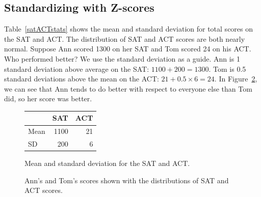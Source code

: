 \subsection{Standardizing with Z-scores}

\noindent%

\newcommand{\satmean}{1100}
\newcommand{\satsd}{200}
\newcommand{\actmean}{21}
\newcommand{\actsd}{6}
\newcommand{\annsatscore}{1300}
\newcommand{\annsatzscore}{1}
\newcommand{\tomsatscore}{24}
\newcommand{\tomsatzscore}{0.5}

\begin{examplewrap}
\begin{nexample}{Table~\vref{satACTstats} shows the mean
    and standard deviation for total scores on the SAT and ACT.
    The distribution of SAT and ACT scores are both nearly normal.
    Suppose Ann scored \annsatscore{} on her SAT and Tom scored
    \tomsatscore{} on his ACT.
    Who performed better?}
  \label{actSAT}%
  We use the standard deviation as a guide.
  Ann is \annsatzscore{} standard deviation above average
  on the SAT: $\satmean{} + \satsd{} = \annsatscore{}$.
  Tom is \tomsatzscore{} standard deviations above the mean
  on the ACT:
  $\actmean{} + \tomsatzscore{} \times \actsd{} = \tomsatscore{}$.
  In Figure~\ref{satActNormals}, we can see that Ann tends
  to do better with respect to everyone else than Tom did,
  so her score was better.
\end{nexample}
\end{examplewrap}

\begin{figure}[h]
\centering
\begin{tabular}{l r r}
  \hline
  & SAT & ACT \\
  \hline
  Mean \hspace{0.3cm} & \satmean{} & \actmean{} \\
  SD & \satsd{} & \actsd{} \\
  \hline
\end{tabular}
\caption{Mean and standard deviation for the SAT and ACT.}
\label{satACTstats}
\end{figure}

\begin{figure}
  \centering
  \caption{Ann's and Tom's scores shown with the distributions
      of SAT and ACT scores.}
  \label{satActNormals}
\end{figure}

